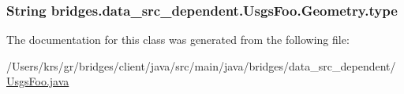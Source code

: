 \subsubsection[{type}]{\setlength{\rightskip}{0pt plus 5cm}String bridges.\+data\+\_\+src\+\_\+dependent.\+Usgs\+Foo.\+Geometry.\+type}\label{classbridges_1_1data__src__dependent_1_1_usgs_foo_1_1_geometry_a985b3a46dad2fcd4e798d2f51198bcfd}


The documentation for this class was generated from the following file\+:\begin{DoxyCompactItemize}
\item 
/\+Users/krs/gr/bridges/client/java/src/main/java/bridges/data\+\_\+src\+\_\+dependent/\hyperlink{_usgs_foo_8java}{Usgs\+Foo.\+java}\end{DoxyCompactItemize}
